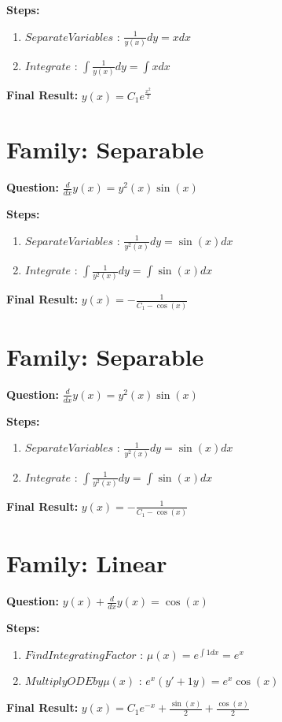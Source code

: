 \documentclass{article}
\begin{document}
\textbf{Steps:}
\begin{enumerate}
\item $Separate Variables$ :  $\frac{1}{y{\left(x \right)}} dy = x dx$
\item $Integrate$ :  $\int \frac{1}{y{\left(x \right)}} dy = \int x dx$
\end{enumerate}
\textbf{Final Result:} $y{\left(x \right)} = C_{1} e^{\frac{x^{2}}{2}}$

\section*{Family: Separable}
\textbf{Question:} $\frac{d}{d x} y{\left(x \right)} = y^{2}{\left(x \right)} \sin{\left(x \right)}$

\textbf{Steps:}
\begin{enumerate}
\item $Separate Variables$ :  $\frac{1}{y^{2}{\left(x \right)}} dy = \sin{\left(x \right)} dx$
\item $Integrate$ :  $\int \frac{1}{y^{2}{\left(x \right)}} dy = \int \sin{\left(x \right)} dx$
\end{enumerate}
\textbf{Final Result:} $y{\left(x \right)} = - \frac{1}{C_{1} - \cos{\left(x \right)}}$

\section*{Family: Separable}
\textbf{Question:} $\frac{d}{d x} y{\left(x \right)} = y^{2}{\left(x \right)} \sin{\left(x \right)}$

\textbf{Steps:}
\begin{enumerate}
\item $Separate Variables$ :  $\frac{1}{y^{2}{\left(x \right)}} dy = \sin{\left(x \right)} dx$
\item $Integrate$ :  $\int \frac{1}{y^{2}{\left(x \right)}} dy = \int \sin{\left(x \right)} dx$
\end{enumerate}
\textbf{Final Result:} $y{\left(x \right)} = - \frac{1}{C_{1} - \cos{\left(x \right)}}$

\section*{Family: Linear}
\textbf{Question:} $y{\left(x \right)} + \frac{d}{d x} y{\left(x \right)} = \cos{\left(x \right)}$

\textbf{Steps:}
\begin{enumerate}
\item $Find Integrating Factor$ :  $\mu(x) = e^{\int 1 dx} = e^{x}$
\item $Multiply ODE by \mu(x)$ :  $e^{x}(y' + 1y) = e^{x} \cos{\left(x \right)}$
\end{enumerate}
\textbf{Final Result:} $y{\left(x \right)} = C_{1} e^{- x} + \frac{\sin{\left(x \right)}}{2} + \frac{\cos{\left(x \right)}}{2}$
\end{document}
